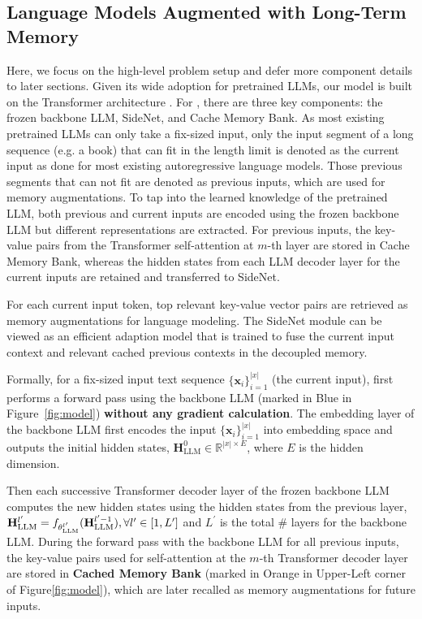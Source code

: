 \subsection{Language Models Augmented with Long-Term Memory}
\label{ssec:mem_llm}
Here, we focus on the high-level problem setup and defer more component details to later sections. Given its wide adoption for pretrained LLMs, our \our{} model is built on the Transformer architecture \cite{Vaswani2017AttentionIA}. For \our{}, there are three key components: the frozen backbone LLM, SideNet, and Cache Memory Bank. As most existing pretrained LLMs can only take a fix-sized input, only the input segment of a long sequence (e.g. a book) that can fit in the length limit is denoted as the current input as done for most existing autoregressive language models. Those previous segments that can not fit are denoted as previous inputs, which are used for memory augmentations. To tap into the learned knowledge of the pretrained LLM, both previous and current inputs are encoded using the frozen backbone LLM but different representations are extracted. For previous inputs, the key-value pairs from the Transformer self-attention at $m$-th layer are stored in Cache Memory Bank, whereas the hidden states from each LLM decoder layer for the current inputs are retained and transferred to SideNet.

For each current input token, top relevant key-value vector pairs are retrieved as memory augmentations for language modeling. The SideNet module can be viewed as an efficient adaption model that is trained to fuse the current input context and relevant cached previous contexts in the decoupled memory.

Formally, for a fix-sized input text sequence $\{\mathbf{x}_i\}_{i=1}^{|x|}$ (the current input), \our{} first performs a forward pass using the backbone LLM (marked in Blue in Figure~\ref{fig:model}) \textbf{without any gradient calculation}. The embedding layer of the backbone LLM first encodes the input $\{\mathbf{x}_i\}_{i=1}^{|x|}$ into embedding space and outputs the initial hidden states, $\mathbf{H}^0_\text{LLM}\in\mathbb{R}^{|x|\times E}$, where $E$ is the hidden dimension.

Then each successive Transformer decoder layer of the frozen backbone LLM computes the new hidden states using the hidden states from the previous layer, $\mathbf{H}_{\text{LLM}}^{l^\prime}=f_{\theta_{\textnormal{LLM}}^{l^{\prime}}} (\mathbf{H}_{\text{LLM}}^{l^{\prime}-1}), \forall l^{\prime}\in[1,{L^\prime}]$ and ${L^\prime}$ is the total \# layers for the backbone LLM. During the forward pass with the backbone LLM for all previous inputs, the key-value pairs used for self-attention at the $m$-th Transformer decoder layer are stored in \textbf{Cached Memory Bank} (marked in Orange in Upper-Left corner of Figure\ref{fig:model}), which are later recalled as memory augmentations for future inputs. 

